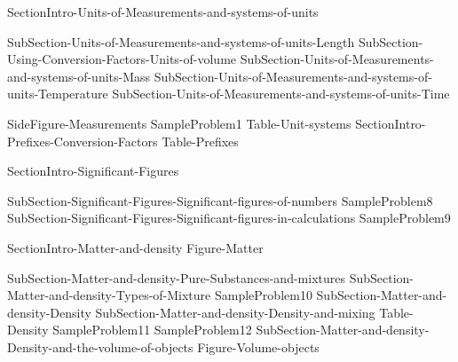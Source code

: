 \documentclass[main.tex]{subfiles}
\begin{document}
{SectionIntro-Units-of-Measurements-and-systems-of-units}
\sloppy\begin{description}
{SubSection-Units-of-Measurements-and-systems-of-units-Length}
{SubSection-Using-Conversion-Factors-Units-of-volume}
{SubSection-Units-of-Measurements-and-systems-of-units-Mass}
{SubSection-Units-of-Measurements-and-systems-of-units-Temperature}
{SubSection-Units-of-Measurements-and-systems-of-units-Time}
\end{description}
{SideFigure-Measurements}
{SampleProblem1}
{Table-Unit-systems}
{SectionIntro-Prefixes-Conversion-Factors}
{Table-Prefixes}
\sloppy{}
{SectionIntro-Significant-Figures}
\sloppy\begin{description}
{SubSection-Significant-Figures-Significant-figures-of-numbers}
{SampleProblem8}
{SubSection-Significant-Figures-Significant-figures-in-calculations}
{SampleProblem9}
\end{description}
\newpage
{SectionIntro-Matter-and-density}
{Figure-Matter}		
\begin{description}
{SubSection-Matter-and-density-Pure-Substances-and-mixtures}
{SubSection-Matter-and-density-Types-of-Mixture}
{SampleProblem10}
{SubSection-Matter-and-density-Density}
{SubSection-Matter-and-density-Density-and-mixing}
{Table-Density} 
{SampleProblem11}
{SampleProblem12}
{SubSection-Matter-and-density-Density-and-the-volume-of-objects}
{Figure-Volume-objects}



\end{description}
\end{document}
